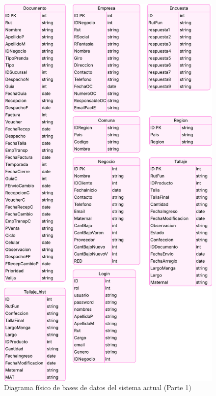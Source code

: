 \begin{figure}[htbp]
    \centering
    \includegraphics[height=0.9\textheight]{figuras/diagramas-actuales/diagrama-bdd-1}
    \caption{Diagrama físico de bases de datos del sistema actual (Parte 1)}
    \label{fig:diagrama-bdd-1-actual}
\end{figure}

